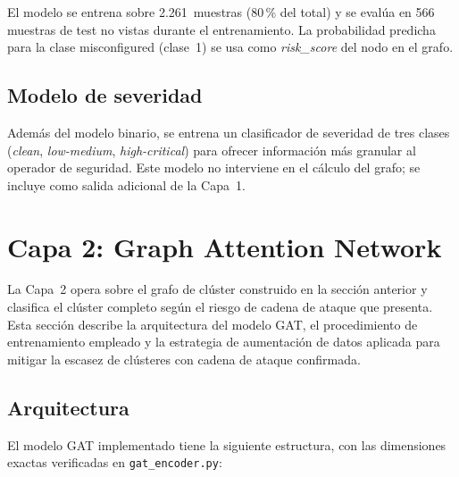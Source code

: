El modelo se entrena sobre 2.261~muestras (80\,\% del total) y se evalúa en 566
muestras de test no vistas durante el entrenamiento. La probabilidad predicha para la
clase misconfigured (clase~1) se usa como \textit{risk\_score} del nodo en el grafo.

\subsection{Modelo de severidad}

Además del modelo binario, se entrena un clasificador de severidad de tres clases
(\textit{clean}, \textit{low-medium}, \textit{high-critical}) para ofrecer información
más granular al operador de seguridad. Este modelo no interviene en el cálculo del
grafo; se incluye como salida adicional de la Capa~1.

\section{Capa 2: Graph Attention Network}
\label{sec:capa2_diseno}

La Capa~2 opera sobre el grafo de clúster construido en la sección anterior y
clasifica el clúster completo según el riesgo de cadena de ataque que presenta.
Esta sección describe la arquitectura del modelo \acs{GAT}, el procedimiento de
entrenamiento empleado y la estrategia de aumentación de datos aplicada para
mitigar la escasez de clústeres con cadena de ataque confirmada.

\subsection{Arquitectura}

El modelo \ac{GAT} \citep{Velickovic2018} implementado tiene la siguiente estructura,
con las dimensiones exactas verificadas en \texttt{gat\_encoder.py}:

